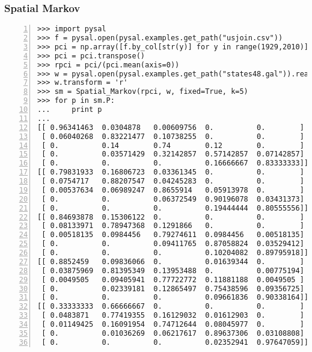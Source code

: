 \documentclass{beamer}
\begin{document}
\begin{frame}[fragile]\frametitle{Spatial Markov }
  \begin{footnotesize}
  \begin{Verbatim}[numbers=left]
>>> import pysal
>>> f = pysal.open(pysal.examples.get_path("usjoin.csv"))
>>> pci = np.array([f.by_col[str(y)] for y in range(1929,2010)])
>>> pci = pci.transpose()
>>> rpci = pci/(pci.mean(axis=0))
>>> w = pysal.open(pysal.examples.get_path("states48.gal")).read()
>>> w.transform = 'r'
>>> sm = Spatial_Markov(rpci, w, fixed=True, k=5)
>>> for p in sm.P:
...     print p
...     
[[ 0.96341463  0.0304878   0.00609756  0.          0.        ]
 [ 0.06040268  0.83221477  0.10738255  0.          0.        ]
 [ 0.          0.14        0.74        0.12        0.        ]
 [ 0.          0.03571429  0.32142857  0.57142857  0.07142857]
 [ 0.          0.          0.          0.16666667  0.83333333]]
[[ 0.79831933  0.16806723  0.03361345  0.          0.        ]
 [ 0.0754717   0.88207547  0.04245283  0.          0.        ]
 [ 0.00537634  0.06989247  0.8655914   0.05913978  0.        ]
 [ 0.          0.          0.06372549  0.90196078  0.03431373]
 [ 0.          0.          0.          0.19444444  0.80555556]]
[[ 0.84693878  0.15306122  0.          0.          0.        ]
 [ 0.08133971  0.78947368  0.1291866   0.          0.        ]
 [ 0.00518135  0.0984456   0.79274611  0.0984456   0.00518135]
 [ 0.          0.          0.09411765  0.87058824  0.03529412]
 [ 0.          0.          0.          0.10204082  0.89795918]]
[[ 0.8852459   0.09836066  0.          0.01639344  0.        ]
 [ 0.03875969  0.81395349  0.13953488  0.          0.00775194]
 [ 0.0049505   0.09405941  0.77722772  0.11881188  0.0049505 ]
 [ 0.          0.02339181  0.12865497  0.75438596  0.09356725]
 [ 0.          0.          0.          0.09661836  0.90338164]]
[[ 0.33333333  0.66666667  0.          0.          0.        ]
 [ 0.0483871   0.77419355  0.16129032  0.01612903  0.        ]
 [ 0.01149425  0.16091954  0.74712644  0.08045977  0.        ]
 [ 0.          0.01036269  0.06217617  0.89637306  0.03108808]
 [ 0.          0.          0.          0.02352941  0.97647059]]
\end{Verbatim} 
\end{footnotesize}
\end{frame}
\end{document}
